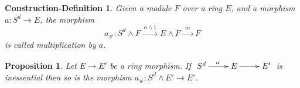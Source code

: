 \documentclass[11pt]{article}
\theoremstyle{plain}
\newtheorem{prop}[thm]{Proposition}
\newtheorem{condef}[thm]{Construction-Definition}
\theoremstyle{definition}
\begin{document}
\setcounter{thm}{13}
\begin{condef}
Given a module $F$ over a ring $E$, and a morphism $a:S^d\to E$, the morphism
\[a_\#:S^d\wedge F\xrightarrow{\ a\wedge 1\ }
E\wedge F\xrightarrow{\ \ m\ \ } F\]
is called multiplication by $a$.
\end{condef}
\begin{prop}
Let $E\to E'$ be a ring morphism. If $\xymatrix{S^d\ar[r]^a&E\ar[r]&E'}$ is
inessential then so is the morphism $a_\#:S^d\wedge E'\to E'$.
\end{prop}
\end{document}
